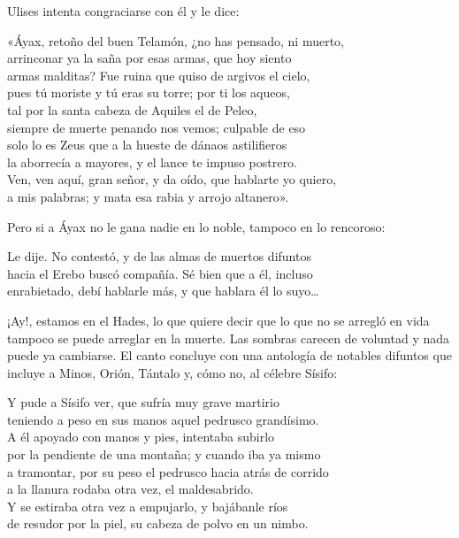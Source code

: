 Ulises intenta congraciarse con él y le dice:

\begin{versocita}
«Áyax, retoño del buen Telamón, ¿no has pensado, ni muerto,\\
arrinconar ya la saña por esas armas, que hoy siento\\
armas malditas? Fue ruina que quiso de argivos el cielo,\\
pues tú moriste y tú eras su torre; por ti los aqueos,\\
tal por la santa cabeza de Aquiles el de Peleo,\\
siempre de muerte penando nos vemos; culpable de eso\\
solo lo es Zeus que a la hueste de dánaos astilifieros\\
la aborrecía a mayores, y el lance te impuso postrero.\\
Ven, ven aquí, gran señor, y da oído, que hablarte yo quiero,\\
a mis palabras; y mata esa rabia y arrojo altanero».
\end{versocita}

Pero si a Áyax no le gana nadie en lo noble, tampoco en lo rencoroso:

\begin{versocita}
Le dije. No contestó, y de las almas de muertos difuntos\\
hacia el Erebo buscó compañía. Sé bien que a él, incluso\\
enrabietado, debí hablarle más, y que hablara él lo suyo…
\end{versocita}

¡Ay!, estamos en el Hades, lo que quiere decir que lo que no se arregló en vida tampoco se puede arreglar en la muerte. Las sombras carecen de voluntad y nada puede ya cambiarse. El canto concluye con una antología de notables difuntos que incluye a Minos, Orión, Tántalo y, cómo no, al célebre Sísifo:

\begin{versocita}
Y pude a Sísifo ver, que sufría muy grave martirio\\
teniendo a peso en sus manos aquel pedrusco grandísimo.\\
A él apoyado con manos y pies, intentaba subirlo\\
por la pendiente de una montaña; y cuando iba ya mismo\\
a tramontar, por su peso el pedrusco hacia atrás de corrido\\
a la llanura rodaba otra vez, el maldesabrido.\\
Y se estiraba otra vez a empujarlo, y bajábanle ríos\\
de resudor por la piel, su cabeza de polvo en un nimbo.
\end{versocita}

